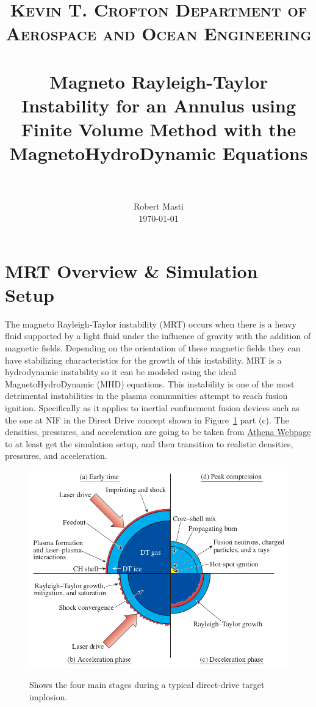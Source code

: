 \documentclass[paper=a4, fontsize=11pt]{scrartcl}
\title{%
    \usefont{OT1}{bch}{b}{n}
    \normalfont\normalsize \textsc{Kevin T. Crofton Department of Aerospace and Ocean Engineering} \\ [25pt]
    \horrule{0.5pt} \\[0.4cm]
    \huge Magneto Rayleigh-Taylor Instability for an Annulus using Finite Volume Method with the MagnetoHydroDynamic Equations  \\
    \horrule{2pt} \\[0.5cm]}
\author{\normalfont\normalsize
  Robert Masti\\[-3pt]  
  \normalsize\today}
\date{}
\numberwithin{equation}{section}                %
\numberwithin{figure}{section}                  %
\numberwithin{table}{section}                           %
\begin{document}
\maketitle
\section{MRT Overview \& Simulation Setup}\label{sec:ovrvw}
The magneto Rayleigh-Taylor instability (MRT) occurs when there is a heavy fluid supported by a light fluid under the influence of gravity with the addition of magnetic fields. Depending on the orientation of these magnetic fields they can have stabilizing characteristics for the growth of this instability. MRT is a hydrodynamic instability so it can be modeled using the ideal MagnetoHydroDynamic (MHD) equations. This instability is one of the most detrimental instabilities in the plasma communities attempt to reach fusion ignition. Specifically as it applies to inertial confinement fusion devices such as the one at NIF in the Direct Drive concept shown in Figure~\ref{fig:ovrvw:dd} part (c). The densities, pressures, and acceleration are going to be taken from \href{https://www.astro.princeton.edu/~jstone/Athena/tests/rt/rt.html}{Athena Webpage} to at least get the simulation setup, and then transition to realistic densities, pressures, and acceleration.


  \begin{figure}[!htb]
    \centering
    \includegraphics[width=0.9\linewidth]{fig/DDfusion}\label{fig:ovrvw:dd}
    \caption{Shows the four main stages during a typical direct-drive target implosion.\cite{craxton2015}}
  \end{figure}
\end{document}
